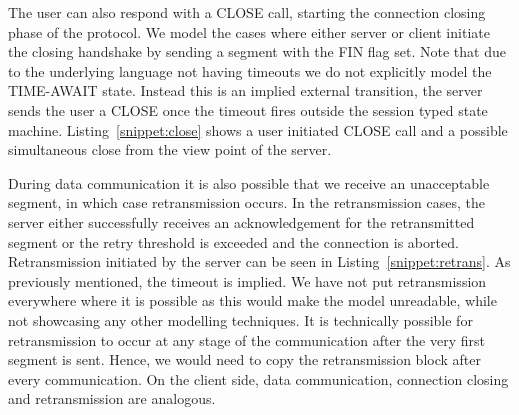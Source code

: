 

The user can also respond with a CLOSE call, starting the connection closing phase of the protocol.
We model the cases where either server or client initiate the closing handshake by sending a segment with the FIN flag set.
Note that due to the underlying language not having timeouts we do not explicitly model the TIME-AWAIT state.
Instead this is an implied external transition, the server sends the user a CLOSE once the timeout fires outside the session typed state machine.
Listing~\ref{snippet:close} shows a user initiated CLOSE call and a possible simultaneous close from the view point of the server.



During data communication it is also possible that we receive an unacceptable segment, in which case retransmission occurs.
In the retransmission cases, the server either successfully receives an acknowledgement for the retransmitted segment or the retry threshold is exceeded and the connection is aborted.
Retransmission initiated by the server can be seen in Listing~\ref{snippet:retrans}.
As previously mentioned, the timeout is implied.
We have not put retransmission everywhere where it is possible as this would make the model unreadable, while not showcasing any other modelling techniques.
It is technically possible for retransmission to occur at any stage of the communication after the very first segment is sent.
Hence, we would need to copy the retransmission block after every communication.
On the client side, data communication, connection closing and retransmission are analogous.
